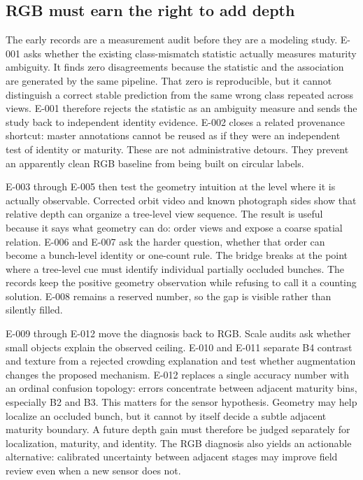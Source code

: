 \documentclass[preprint,12pt]{elsarticle}
\begin{document}
\subsection{RGB must earn the right to add depth}
The early records are a measurement audit before they are a modeling study.
E-001 asks whether the existing class-mismatch statistic actually measures
maturity ambiguity. It finds zero disagreements because the statistic and the
association are generated by the same pipeline. That zero is reproducible,
but it cannot distinguish a correct stable prediction from the same wrong
class repeated across views. E-001 therefore rejects the statistic as an
ambiguity measure and sends the study back to independent identity evidence.
E-002 closes a related provenance shortcut: master annotations cannot be
reused as if they were an independent test of identity or maturity. These are
not administrative detours. They prevent an apparently clean RGB baseline
from being built on circular labels.

E-003 through E-005 then test the geometry intuition at the level where it is
actually observable. Corrected orbit video and known photograph sides show
that relative depth can organize a tree-level view sequence. The result is
useful because it says what geometry can do: order views and expose a coarse
spatial relation. E-006 and E-007 ask the harder question, whether that order
can become a bunch-level identity or one-count rule. The bridge breaks at the
point where a tree-level cue must identify individual partially occluded
bunches. The records keep the positive geometry observation while refusing to
call it a counting solution. E-008 remains a reserved number, so the gap is
visible rather than silently filled.

E-009 through E-012 move the diagnosis back to RGB. Scale audits ask whether
small objects explain the observed ceiling. E-010 and E-011 separate B4
contrast and texture from a rejected crowding explanation and test whether
augmentation changes the proposed mechanism. E-012 replaces a single accuracy
number with an ordinal confusion topology: errors concentrate between
adjacent maturity bins, especially B2 and B3. This matters for the sensor
hypothesis. Geometry may help localize an occluded bunch, but it cannot by
itself decide a subtle adjacent maturity boundary. A future depth gain must
therefore be judged separately for localization, maturity, and identity. The
RGB diagnosis also yields an actionable alternative: calibrated uncertainty
between adjacent stages may improve field review even when a new sensor does
not.
\end{document}
